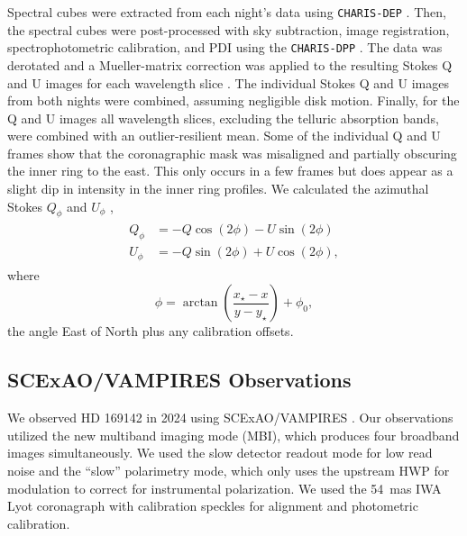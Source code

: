 Spectral cubes were extracted from each night's data using \texttt{CHARIS-DEP} \citep{brandt_data_2017}. Then, the spectral cubes were post-processed with sky subtraction, image registration, spectrophotometric calibration, and PDI using the \texttt{CHARIS-DPP} \citep{currie_subaruscexao_2017,lawson_high-contrast_2021}. The data was derotated and a Mueller-matrix correction was applied to the resulting Stokes Q and U images for each wavelength slice \citep{joost_t_hart_full_2021}. The individual Stokes Q and U images from both nights were combined, assuming negligible disk motion. Finally, for the Q and U images all wavelength slices, excluding the telluric absorption bands, were combined with an outlier-resilient mean. Some of the individual Q and U frames show that the coronagraphic mask was misaligned and partially obscuring the inner ring to the east. This only occurs in a few frames but does appear as a slight dip in intensity in the inner ring profiles. We calculated the azimuthal Stokes $Q_\phi$ and $U_\phi$ \citep{schmid_limb_2006,monnier_multiple_2019},
\begin{align}
\begin{split}
    \label{eqn:az_stokes}
    Q_\phi &= -Q\cos{\left(2\phi\right)} - U\sin{\left(2\phi\right)} \\
    U_\phi &= -Q\sin{\left(2\phi\right)} + U\cos{\left(2\phi\right)},
\end{split}
\end{align}
where
\begin{equation}
    \phi = \arctan{\left( \frac{x_\star - x}{y - y_\star} \right)} + \phi_0,
\end{equation}
the angle East of North plus any calibration offsets.

\subsection{SCExAO/VAMPIRES Observations\label{sec:obs_vampires}}

We observed HD 169142 in 2024 using SCExAO/VAMPIRES \citep{norris_vampires_2015,lucas_visible-light_2024-1}. Our observations utilized the new multiband imaging mode (MBI), which produces four broadband images simultaneously. We used the slow detector readout mode for low read noise and the ``slow'' polarimetry mode, which only uses the upstream HWP for modulation to correct for instrumental polarization. We used the \SI{54}{mas} IWA Lyot coronagraph with calibration speckles for alignment and photometric calibration.

